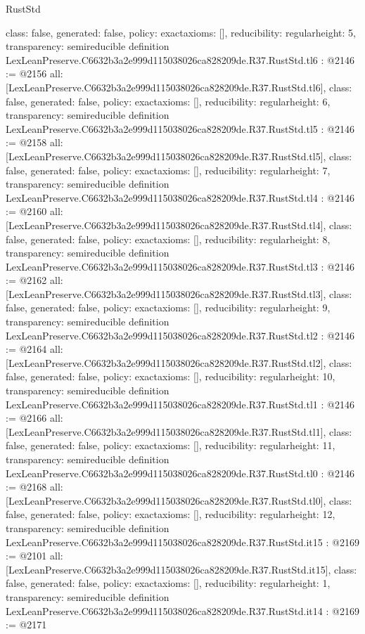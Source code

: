 \begin{lexlean}{RustStd}
\begin{coremodule}
{  class: false,
  generated: false,
  policy: exact{axioms: []},
  reducibility: regular{height: 5},
  transparency: semireducible
}
definition LexLeanPreserve.C6632b3a2e999d115038026ca828209de.R37.RustStd.tl6 : @2146 := @2156 {
  all: [LexLeanPreserve.C6632b3a2e999d115038026ca828209de.R37.RustStd.tl6],
  class: false,
  generated: false,
  policy: exact{axioms: []},
  reducibility: regular{height: 6},
  transparency: semireducible
}
definition LexLeanPreserve.C6632b3a2e999d115038026ca828209de.R37.RustStd.tl5 : @2146 := @2158 {
  all: [LexLeanPreserve.C6632b3a2e999d115038026ca828209de.R37.RustStd.tl5],
  class: false,
  generated: false,
  policy: exact{axioms: []},
  reducibility: regular{height: 7},
  transparency: semireducible
}
definition LexLeanPreserve.C6632b3a2e999d115038026ca828209de.R37.RustStd.tl4 : @2146 := @2160 {
  all: [LexLeanPreserve.C6632b3a2e999d115038026ca828209de.R37.RustStd.tl4],
  class: false,
  generated: false,
  policy: exact{axioms: []},
  reducibility: regular{height: 8},
  transparency: semireducible
}
definition LexLeanPreserve.C6632b3a2e999d115038026ca828209de.R37.RustStd.tl3 : @2146 := @2162 {
  all: [LexLeanPreserve.C6632b3a2e999d115038026ca828209de.R37.RustStd.tl3],
  class: false,
  generated: false,
  policy: exact{axioms: []},
  reducibility: regular{height: 9},
  transparency: semireducible
}
definition LexLeanPreserve.C6632b3a2e999d115038026ca828209de.R37.RustStd.tl2 : @2146 := @2164 {
  all: [LexLeanPreserve.C6632b3a2e999d115038026ca828209de.R37.RustStd.tl2],
  class: false,
  generated: false,
  policy: exact{axioms: []},
  reducibility: regular{height: 10},
  transparency: semireducible
}
definition LexLeanPreserve.C6632b3a2e999d115038026ca828209de.R37.RustStd.tl1 : @2146 := @2166 {
  all: [LexLeanPreserve.C6632b3a2e999d115038026ca828209de.R37.RustStd.tl1],
  class: false,
  generated: false,
  policy: exact{axioms: []},
  reducibility: regular{height: 11},
  transparency: semireducible
}
definition LexLeanPreserve.C6632b3a2e999d115038026ca828209de.R37.RustStd.tl0 : @2146 := @2168 {
  all: [LexLeanPreserve.C6632b3a2e999d115038026ca828209de.R37.RustStd.tl0],
  class: false,
  generated: false,
  policy: exact{axioms: []},
  reducibility: regular{height: 12},
  transparency: semireducible
}
definition LexLeanPreserve.C6632b3a2e999d115038026ca828209de.R37.RustStd.it15 : @2169 := @2101 {
  all: [LexLeanPreserve.C6632b3a2e999d115038026ca828209de.R37.RustStd.it15],
  class: false,
  generated: false,
  policy: exact{axioms: []},
  reducibility: regular{height: 1},
  transparency: semireducible
}
definition LexLeanPreserve.C6632b3a2e999d115038026ca828209de.R37.RustStd.it14 : @2169 := @2171 {
}
\end{coremodule}
\end{lexlean}
